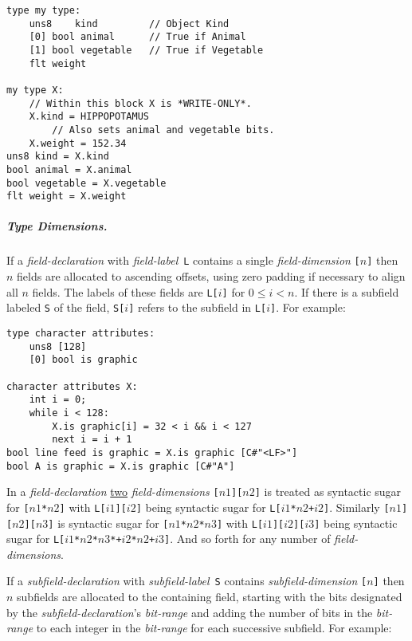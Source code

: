 \documentclass[12pt]{article}
\newcommand{\subsubsubsubsection}[1]{\subparagraph[#1]{#1.}}
\newenvironment{indpar}[1][0.3in]%
	{\begin{list}{}%
		     {\setlength{\itemsep}{0in}%
		      \setlength{\topsep}{0in}%
		      \setlength{\parsep}{1ex}%
		      \setlength{\labelwidth}{#1}%
		      \setlength{\leftmargin}{#1}%
		      \addtolength{\leftmargin}{\labelsep}}%
	 \item}%
	{\end{list}}
\begin{document}
\begin{indpar}\begin{verbatim}
type my type:
    uns8    kind         // Object Kind
    [0] bool animal      // True if Animal
    [1] bool vegetable   // True if Vegetable
    flt weight

my type X:
    // Within this block X is *WRITE-ONLY*.
    X.kind = HIPPOPOTAMUS
        // Also sets animal and vegetable bits.
    X.weight = 152.34
uns8 kind = X.kind
bool animal = X.animal
bool vegetable = X.vegetable
flt weight = X.weight
\end{verbatim}\end{indpar}

\subsubsubsubsection{Type Dimensions}

If a {\em field-declaration} with {\em field-label}\, {\tt L} contains 
a single {\em field-dimension} {\tt [$n$]} then $n$ fields are
allocated to ascending offsets, using zero padding
if necessary to align all $n$ fields.  The labels of these
fields are {\tt L[$i$]} for $0\le i<n$.  If there is a subfield
labeled {\tt S} of the field, {\tt S[$i$]} refers to the
subfield in {\tt L[$i$]}.  For example:

\begin{indpar}\begin{verbatim}
type character attributes:
    uns8 [128]
    [0] bool is graphic

character attributes X:
    int i = 0;
    while i < 128:
        X.is graphic[i] = 32 < i && i < 127
        next i = i + 1
bool line feed is graphic = X.is graphic [C#"<LF>"]
bool A is graphic = X.is graphic [C#"A"]
\end{verbatim}\end{indpar}

In a {\em field-declaration}
\underline{two} {\em field-dimensions} {\tt [$n1$][$n2$]} is
treated as syntactic sugar for {\tt [$n1$*$n2$]} with
{\tt L[$i1$][$i2$]} being syntactic sugar for
{\tt L[$i1$*$n2$+$i2$]}.  Similarly
{\tt [$n1$][$n2$][$n3$]} is
syntactic sugar for {\tt [$n1$*$n2$*$n3$]} with
{\tt L[$i1$][$i2$][$i3$]} being syntactic sugar for
{\tt L[$i1$*$n2$*$n3$*+$i2$*$n2$+$i3$]}.  And so forth for any
number of {\em field-dimensions}.

If a {\em subfield-declaration} with {\em subfield-label}\, {\tt S} contains 
{\em subfield-dimension} {\tt [$n$]} then $n$ subfields are
allocated to the containing field, starting with the bits
designated by the {\em subfield-declaration}'s {\em bit-range}
and adding the number of bits in the {\em bit-range} to each integer
in the {\em bit-range} for each successive subfield.
For example:
\end{document}
